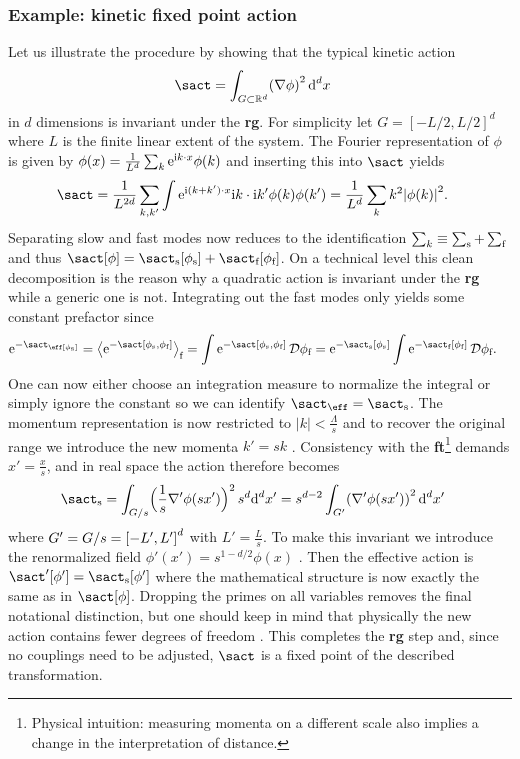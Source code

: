 \documentclass[english, parskip=full]{scrartcl}
\renewcommand{\gls}[1]{\textbf{#1}}
\newcommand{\trspace}{real space}
\begin{document}
\subsubsection{Example: kinetic fixed point action}
Let us illustrate the procedure by showing that the typical kinetic action \cite[]{Fradkin_2013}
\begin{align*}
\sact &= \int_{G\subset \mathbb{R}^d} \kla*{\nabla\phi}^2 \,\d^dx
\end{align*}
in $d$ dimensions is invariant under the \gls{rg}.
For simplicity let $G=[-L/2, L/2]^d$ where $L$ is the finite linear extent of the system.
The Fourier representation of $\phi$ is given by $\phi(x) = \frac{1}{L^d} \sum_k \powe{\i k\cdot x} \phi(k)$ and inserting this into $\sact$ yields
\begin{align*}
\sact &= \frac{1}{L^{2d}} \sum_{k,k'} \int \powe{\i (k+k')\cdot x} \i k \cdot \i k' \phi(k) \phi(k') = \frac{1}{L^d} \sum_k k^2 \abs*{\phi(k)}^2.
\end{align*}
Separating slow and fast modes now reduces to the identification $\sum_k \equiv \sum_\s + \sum_\f$ and thus $\sact[\phi] = \sact_{\s}[\phi_\s] + \sact_{\f}[\phi_\f]$.
On a technical level this clean decomposition is the reason why a quadratic action is invariant under the \gls{rg} while a generic one is not.
Integrating out the fast modes only yields some constant prefactor since
\begin{align*}
\powe{-\sact_\eff[\phi_\s]} &= \bra[\big]{\powe{-\sact[\phi_\s, \phi_\f]}}_\f = \int \powe{-\sact[\phi_\s, \phi_\f]}\,\mathcal{D}\phi_\f = \powe{-\sact_{\s}[\phi_\s]} \int \powe{- \sact_{\f}[\phi_\f]}\,\mathcal{D}\phi_\f.
\end{align*}
One can now either choose an integration measure to normalize the integral or simply ignore the constant so we can identify $\sact_\eff = \sact_\s$.
The momentum representation is now restricted to $|k|< \frac{\Lambda}{s}$ and to recover the original range we introduce the new momenta $k'=sk$ \cite[.4]{QFT_RG_Fradkin_2021}.
Consistency with the \gls{ft}\footnote{Physical intuition: measuring momenta on a different scale also implies a change in the interpretation of distance.} demands $x'=\frac{x}{s}$, and in \trspace{} the action therefore becomes
\begin{align*}
\sact_{\s} &= \int_{G/s}\kla[\Big]{ \frac{1}{s} \nabla' \phi(sx')}^2 \,s^d\d^dx' = s^{d-2} \int_{G'} \kla*{\nabla'\phi(sx')}^2\,\d^dx'
\end{align*}
where $G'=G/s = \klb*{-L', L'}^d$ with $L'=\frac{L}{s}$.
To make this invariant we introduce the renormalized field $\phi'(x') = s^{1-d/2} \phi(x)$ \cite[]{AltlandSimons}.
Then the effective action is $\sact'[\phi'] = \sact_\s[\phi']$ where the mathematical structure is now exactly the same as in $\sact[\phi]$.
Dropping the primes on all variables removes the final notational distinction, but one should keep in mind that physically the new action contains fewer degrees of freedom \cite[]{Bosonization_Schulz_1995}.
This completes the \gls{rg} step and, since no couplings need to be adjusted, $\sact$ is a fixed point of the described transformation.
\end{document}
